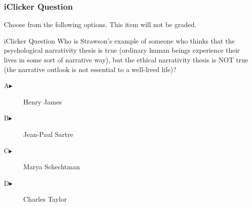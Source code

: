 \begin{frame}
  \frametitle{iClicker Question}
Choose from the following options. This item will not be graded.
\begin{block}{iClicker Question}
Who is Strawson's example of someone who thinks that the psychological
narrativity thesis is true (ordinary human beings experience their
lives in some sort of narrative way), but the ethical narrativity
thesis is NOT true (the narrative outlook is not essential to a
well-lived life)?
\end{block}
\begin{description}
\item[A\hspace{.2in}$\blacktriangleright$] Henry James
\item[B\hspace{.2in}$\blacktriangleright$] Jean-Paul Sartre
\item[C\hspace{.2in}$\blacktriangleright$] Marya Schechtman
\item[D\hspace{.2in}$\blacktriangleright$] Charles Taylor
\end{description}
\end{frame}

